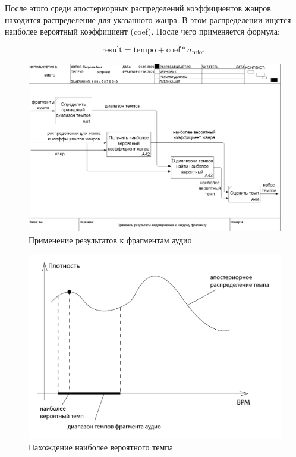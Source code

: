 После этого среди апостериорных распределений коэффициентов жанров находится распределение для указанного жанра. В этом распределении ищется наиболее вероятный коэффициент (coef). После чего применяется формула:

\begin{equation}
	\text{result} = \text{tempo} + \text{coef} * \sigma_{\text{prior}}.
\end{equation}

\begin{figure}[h]
	\centering
	\includegraphics[scale=0.25]{inc/img/tempo_idef/04_A4.png}
	\caption{Применение результатов к фрагментам аудио}
	\label{img:tempo_3}
\end{figure}

\begin{figure}[h]
	\centering
	\includegraphics[scale=0.5]{svg/res_tempo.pdf}
	\caption{Нахождение наиболее вероятного темпа}
	\label{img:res_tempo}
\end{figure}

